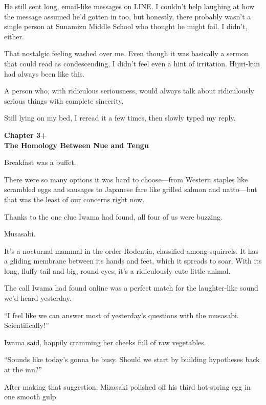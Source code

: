 \documentclass[
    a4paper,
    12pt,
    twoside,
    openany,
    UTF8,
    fontset=windows
]{ctexbook}
\begin{document}
He still sent long, email-like messages on LINE. I couldn't help laughing at how the message assumed he'd gotten in too, but honestly, there probably wasn't a single person at Sunamizu Middle School who thought he might fail. I didn't, either.

That nostalgic feeling washed over me. Even though it was basically a sermon that could read as condescending, I didn't feel even a hint of irritation. Hijiri-kun had always been like this.

A person who, with ridiculous seriousness, would always talk about ridiculously serious things with complete sincerity.

Still lying on my bed, I reread it a few times, then slowly typed my reply.


\clearpage
\thispagestyle{plain}
\begin{center}
    \large\bfseries
    Chapter 3+\\
    The Homology Between Nue and Tengu
\end{center}
\label{sec:ch3p}
\vspace{1cm}

Breakfast was a buffet.

There were so many options it was hard to choose---from Western staples like scrambled eggs and sausages to Japanese fare like grilled salmon and natto---but that was the least of our concerns right now.

Thanks to the one clue Iwama had found, all four of us were buzzing.

Musasabi.

It's a nocturnal mammal in the order Rodentia, classified among squirrels.
It has a gliding membrane between its hands and feet, which it spreads to soar.
With its long, fluffy tail and big, round eyes, it's a ridiculously cute little animal.

The call Iwama had found online was a perfect match for the laughter-like sound we'd heard yesterday.

``I feel like we can answer most of yesterday's questions with the musasabi. Scientifically!''

Iwama said, happily cramming her cheeks full of raw vegetables.

``Sounds like today's gonna be busy. Should we start by building hypotheses back at the inn?''

After making that suggestion, Mizasaki polished off his third hot-spring egg in one smooth gulp.
\end{document}
